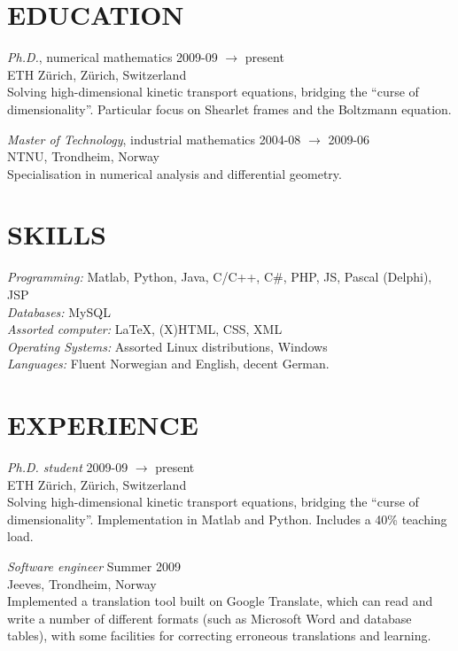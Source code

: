 \documentclass[line,margin]{res}
\newcommand{\zh}{Z\"{u}rich}
\begin{document}
\address{Forchstrasse 168, CH-8032 \zh}
\address{+41 78 634 68 37}


\begin{resume}

\section{EDUCATION} 
    {\em Ph.D.}, numerical mathematics \hfill 2009-09 $\to$ present \\
    ETH \zh, \zh, Switzerland \\
    Solving high-dimensional kinetic transport equations, bridging the ``curse of dimensionality''. Particular
    focus on Shearlet frames and the Boltzmann equation.

    {\em Master of Technology}, industrial mathematics \hfill 2004-08 $\to$ 2009-06 \\
    NTNU, Trondheim, Norway \\
    Specialisation in numerical analysis and differential geometry.


\section{SKILLS}
    {\em Programming:} Matlab, Python, Java, C/C++, C\#, PHP, JS, Pascal (Delphi), JSP \\
    {\em Databases:} MySQL \\
    {\em Assorted computer:} \LaTeX, (X)HTML, CSS, XML \\
    {\em Operating Systems:} Assorted Linux distributions, Windows \\
    {\em Languages:} Fluent Norwegian and English, decent German.


\section{EXPERIENCE} 
    {\em Ph.D. student} \hfill 2009-09 $\to$ present \\
    ETH \zh, \zh, Switzerland \\
    Solving high-dimensional kinetic transport equations, bridging the ``curse of dimensionality''.
    Implementation in Matlab and Python. Includes a 40\% teaching load.

    {\em Software engineer} \hfill Summer 2009 \\
    Jeeves, Trondheim, Norway \\
    Implemented a translation tool built on Google Translate, which can read and write a number of different
    formats (such as Microsoft Word and database tables), with some facilities for correcting erroneous
    translations and learning.


\end{resume}
\end{document}
